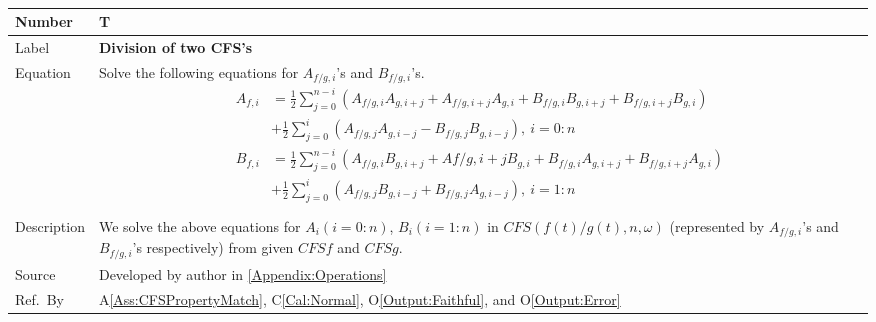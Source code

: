 \documentclass[12pt]{article}
\newcommand{\colAwidth}{0.13\textwidth}
\newcommand{\colBwidth}{0.82\textwidth}
\newcounter{theorynum} %
\newcommand{\aref}[1]{A\ref{#1}}
\newcommand{\calref}[1]{C\ref{#1}}
\newcommand{\oref}[1]{O\ref{#1}}
\begin{document}
~\newline
\noindent
\begin{minipage}{\textwidth}
	\renewcommand*{\arraystretch}{1.5}
	\begin{tabular}{| p{\colAwidth} | p{\colBwidth}|}
		\hline
		\rowcolor[gray]{0.9}
		Number& T{theorynum}\thetheorynum 
		\label{T:Division}\\
		\hline
		Label&\bf Division of two CFS's\\
		\hline
		Equation& Solve the following equations for $A_{f/g, i}$'s 
		and $B_{f/g, i}$'s.   
		\begin{equation}
		\begin{aligned}
		A_{f, i}&=\frac{1}{2}\sum_{j=0}^{n-i}(A_{f/g,i}A_{g,i+j}
		+A_{f/g, i+j}A_{g, i}+B_{f/g,i}B_{g,i+j}+B_{f/g,i+j}B_{g,i})\\
		&+\frac{1}{2}\sum_{j=0}^{i}(A_{f/g,j}A_{g,i-j}-B_{f/g,j}B_{g,i-j}),
		~i=0:n\\
		B_{f, i}&=\frac{1}{2}\sum_{j=0}^{n-i}(A_{f/g,i}B_{g,i+j}
		+A{f/g, i+j}B_{g, i}+B_{f/g,i}A_{g,i+j}+B_{f/g,i+j}A_{g,i})\\
		&+\frac{1}{2}\sum_{j=0}^{i}(A_{f/g,j}B_{g,i-j}+B_{f/g,j}A_{g,i-j}),
		~i=1:n\\
		\end{aligned}
		\end{equation}\\
		\hline
		Description & We solve the above equations for 
		$A_i(i=0:n)$, $B_i(i=1:n)$ in $\mathit{CFS}(f(t)/g(t), n, \omega)$ 
		(represented by $A_{f/g, i}$'s and $B_{f/g, i}$'s respectively) 
		from given $\mathit{CFSf}$ and $\mathit{CFSg}$.\\
		\hline
		Source & Developed by author in \autoref{Appendix:Operations}\\
		\hline
		Ref.\ By & \aref{Ass:CFSPropertyMatch}, \calref{Cal:Normal}, 
		\oref{Output:Faithful}, 
		and \oref{Output:Error}\\
		\hline
	\end{tabular}
\end{minipage}\\
\end{document}
